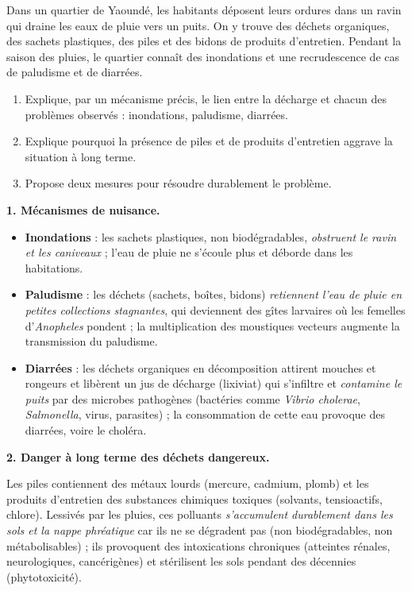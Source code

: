 \documentclass[11pt]{article}
\newcommand{\cle}[1]{{\popxbold\color{popdark}#1}}
\begin{document}
\begin{exoresolu}
Dans un quartier de Yaoundé, les habitants déposent leurs ordures dans un ravin qui draine les eaux de pluie vers un puits. On y trouve des déchets organiques, des sachets plastiques, des piles et des bidons de produits d'entretien. Pendant la saison des pluies, le quartier connaît des inondations et une recrudescence de cas de paludisme et de diarrées.
\begin{enumerate}
\item Explique, par un mécanisme précis, le lien entre la décharge et chacun des problèmes observés : inondations, paludisme, diarrées.
\item Explique pourquoi la présence de piles et de produits d'entretien aggrave la situation à long terme.
\item Propose deux mesures pour résoudre durablement le problème.
\end{enumerate}
\tcblower
\textbf{1. Mécanismes de nuisance.}
\begin{itemize}
\item \textbf{Inondations} : les sachets plastiques, non biodégradables, \emph{obstruent le ravin et les caniveaux} ; l'eau de pluie ne s'écoule plus et déborde dans les habitations.
\item \textbf{Paludisme} : les déchets (sachets, boîtes, bidons) \emph{retiennent l'eau de pluie en petites collections stagnantes}, qui deviennent des gîtes larvaires où les femelles d'\emph{Anopheles} pondent ; la multiplication des moustiques vecteurs augmente la transmission du paludisme.
\item \textbf{Diarrées} : les déchets organiques en décomposition attirent mouches et rongeurs et libèrent un jus de décharge (\cle{lixiviat}) qui s'infiltre et \emph{contamine le puits} par des microbes pathogènes (bactéries comme \emph{Vibrio cholerae}, \emph{Salmonella}, virus, parasites) ; la consommation de cette eau provoque des diarrées, voire le choléra.
\end{itemize}
\textbf{2. Danger à long terme des déchets dangereux.}

Les piles contiennent des \cle{métaux lourds} (mercure, cadmium, plomb) et les produits d'entretien des substances chimiques toxiques (solvants, tensioactifs, chlore). Lessivés par les pluies, ces polluants \emph{s'accumulent durablement dans les sols et la nappe phréatique} car ils ne se dégradent pas (non biodégradables, non métabolisables) ; ils provoquent des intoxications chroniques (atteintes rénales, neurologiques, cancérigènes) et stérilisent les sols pendant des décennies (phytotoxicité).


\end{exoresolu}
\end{document}
